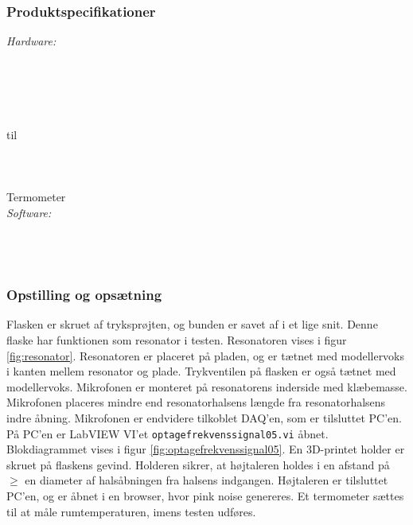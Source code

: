 	\subsubsection{Produktspecifikationer}
	\textit{Hardware:}\\
	\\
	\elektretto\\
	\daq\\
	\\	
	\snot\\	
	 til \\
	\modellervoks\\
	\plade\\
	\PC\\
	Termometer\\
	
	\textit{Software:}\\
	\labview\\
	\daqsoft\\
	\onlineg\\
	
		\subsubsection{Opstilling og opsætning}
	Flasken er skruet af tryksprøjten, og bunden er savet af i et lige snit. Denne flaske har funktionen som resonator i testen. Resonatoren vises i figur \ref{fig:resonator}. Resonatoren er placeret på pladen, og er tætnet med modellervoks i kanten mellem resonator og plade. Trykventilen på flasken er også tætnet med modellervoks.
Mikrofonen er monteret på resonatorens inderside med klæbemasse. Mikrofonen placeres mindre end resonatorhalsens længde fra  resonatorhalsens indre åbning. Mikrofonen er endvidere tilkoblet DAQ'en, som er tilsluttet PC'en. På PC'en er LabVIEW VI'et \texttt{optagefrekvenssignal05.vi} åbnet. Blokdiagrammet vises i figur \ref{fig:optagefrekvenssignal05}. En 3D-printet holder er skruet på flaskens gevind. Holderen sikrer, at højtaleren holdes i en afstand på $\geq$ en diameter af halsåbningen fra halsens indgangen. Højtaleren er tilsluttet PC'en, og \onlineg er åbnet i en browser, hvor pink noise genereres. 
	Et termometer sættes til at måle rumtemperaturen, imens testen udføres. 
	
